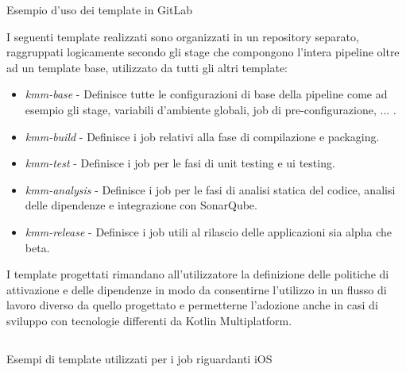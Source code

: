 \begin{listing}[H]
\inputminted{yaml}{code/4-templating}
\caption{Esempio d'uso dei template in GitLab}
\end{listing}

I seguenti template realizzati sono organizzati in un repository separato, raggruppati logicamente secondo gli stage che compongono l'intera pipeline oltre ad un template base, utilizzato da tutti gli altri template:
\begin{itemize}
    \item \textit{kmm-base} - Definisce tutte le configurazioni di base della pipeline come ad esempio gli stage, variabili d'ambiente globali, job di pre-configurazione, ... .
    \item \textit{kmm-build} - Definisce i job relativi alla fase di compilazione e packaging.
    \item \textit{kmm-test} - Definisce i job per le fasi di unit testing e ui testing.
    \item \textit{kmm-analysis} - Definisce i job per le fasi di analisi statica del codice, analisi delle dipendenze e integrazione con SonarQube.
    \item \textit{kmm-release} - Definisce i job utili al rilascio delle applicazioni sia alpha che beta.
\end{itemize}

I template progettati rimandano all'utilizzatore la definizione delle politiche di attivazione e delle dipendenze in modo da consentirne l'utilizzo in un flusso di lavoro diverso da quello progettato e permetterne l'adozione anche in casi di sviluppo con tecnologie differenti da Kotlin Multiplatform.

\begin{listing}[H]
\inputminted{yaml}{code/4-templating2}
\caption{Esempi di template utilizzati per i job riguardanti iOS}
\end{listing}
